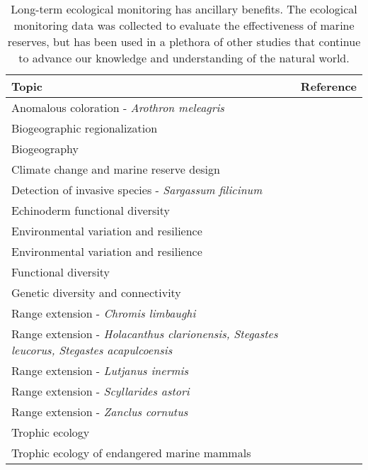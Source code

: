 \begin{table}

\caption{\label{tab:lit}Long-term ecological monitoring has ancillary benefits. The ecological monitoring data was collected to evaluate the effectiveness of marine reserves, but has been used in a plethora of other studies that continue to advance our knowledge and understanding of the natural world.}
\centering
\begin{tabular}[t]{>{\raggedright\arraybackslash}p{9cm}l}
\toprule
Topic & Reference\\
\midrule
Anomalous coloration - \emph{Arothron meleagris} & \citet{reyes2017color}\\
Biogeographic regionalization & \citet{chollett2017case}\\
Biogeography & \citet{olivier2018functional}\\
Climate change and marine reserve design & \citet{alvarez2018designing}\\
Detection of invasive species - \emph{Sargassum filicinum} & \citet{riosmena2012invasive}\\
\addlinespace
Echinoderm functional diversity & \citet{rojas2020echinoderm}\\
Environmental variation and resilience & \citet{micheli2012evidence}\\
Environmental variation and resilience & \citet{beas2020geographic}\\
Functional diversity & \citet{ramirez2017functional}\\
Genetic diversity and connectivity & \citet{munguia2015marine}\\
\addlinespace
Range extension - \emph{Chromis limbaughi} & \citet{martinez2014range}\\
Range extension - \emph{Holacanthus clarionensis, Stegastes leucorus, Stegastes acapulcoensis} & \citet{hernandez2016occurrence}\\
Range extension - \emph{Lutjanus inermis} & \citet{fernandez2015range}\\
Range extension - \emph{Scyllarides astori} & \citet{melo2021northernmost}\\
Range extension - \emph{Zanclus cornutus} & \citet{fernandez2018northernmost}\\
\addlinespace
Trophic ecology & \citet{vilalta2018mass}\\
Trophic ecology of endangered marine mammals & \citet{arias2019marine}\\
\bottomrule
\end{tabular}
\end{table}